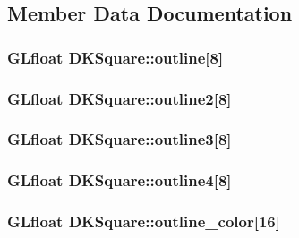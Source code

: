 \subsection{Member Data Documentation}
\hypertarget{class_d_k_square_aeaf6eedc694eccfafcb03b7b7f78e1f8}{
\subsubsection[{outline}]{\setlength{\rightskip}{0pt plus 5cm}G\-Lfloat D\-K\-Square\-::outline\mbox{[}8\mbox{]}}}\label{class_d_k_square_aeaf6eedc694eccfafcb03b7b7f78e1f8}
\hypertarget{class_d_k_square_aad90d230189b0c82304faa9426e3ebef}{
\subsubsection[{outline2}]{\setlength{\rightskip}{0pt plus 5cm}G\-Lfloat D\-K\-Square\-::outline2\mbox{[}8\mbox{]}}}\label{class_d_k_square_aad90d230189b0c82304faa9426e3ebef}
\hypertarget{class_d_k_square_a6f7cd7d93e8ca07e5ace21aea4fd8926}{
\subsubsection[{outline3}]{\setlength{\rightskip}{0pt plus 5cm}G\-Lfloat D\-K\-Square\-::outline3\mbox{[}8\mbox{]}}}\label{class_d_k_square_a6f7cd7d93e8ca07e5ace21aea4fd8926}
\hypertarget{class_d_k_square_ab43a5926d331ff1caebf997d9d840c1c}{
\subsubsection[{outline4}]{\setlength{\rightskip}{0pt plus 5cm}G\-Lfloat D\-K\-Square\-::outline4\mbox{[}8\mbox{]}}}\label{class_d_k_square_ab43a5926d331ff1caebf997d9d840c1c}
\hypertarget{class_d_k_square_a2373e3e0b3c4eb9634c7ad9fb9e3260a}{
\subsubsection[{outline\-\_\-color}]{\setlength{\rightskip}{0pt plus 5cm}G\-Lfloat D\-K\-Square\-::outline\-\_\-color\mbox{[}16\mbox{]}}}\label{class_d_k_square_a2373e3e0b3c4eb9634c7ad9fb9e3260a}
